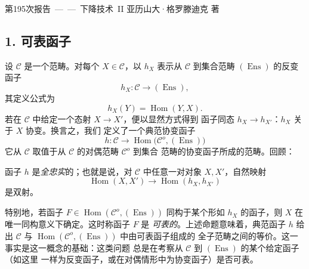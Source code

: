 \unit{第195次报告——下降技术 II}
%
  {亚历山大·格罗滕迪克 著}


\subsection*{1. 可表函子}

设 $\mathcal C$ 是一个范畴。对每个 $X\in\mathcal C$，以 $h_X$ 表示从
$\mathcal C$ 到集合范畴 $(\operatorname{Ens})$ 的反变函子
\[
  h_X:\mathcal C\longrightarrow(\operatorname{Ens}),
\]
其定义公式为
\[
  h_X(Y)=\operatorname{Hom}(Y,X).
\]
若在 $\mathcal C$ 中给定一个态射 $X\longrightarrow X'$，便以显然方式得到
函子同态 $h_X\longrightarrow h_{X'}$：$h_X$ 关于 $X$ 协变。换言之，我们
定义了一个典范协变函子
\[
  h:\mathcal C\longrightarrow
  \operatorname{Hom}\bigl(\mathcal C^o,(\operatorname{Ens})\bigr)
\]
它从 $\mathcal C$ 取值于从 $\mathcal C$ 的对偶范畴 $\mathcal C^o$ 到集合
范畴的协变函子所成的范畴。回顾：

 函子 $h$ 是\emph{全忠实}的；也就是说，对 $\mathcal C$
中任意一对对象 $X,X'$，自然映射
\[
  \operatorname{Hom}(X,X')\longrightarrow
  \operatorname{Hom}(h_X,h_{X'})
\]
是双射。

特别地，若函子
$F\in\operatorname{Hom}(\mathcal C^o,(\operatorname{Ens}))$ 同构于某个形如
$h_X$ 的函子，则 $X$ 在唯一同构意义下确定。这时称函子 $F$ 是
\emph{可表的}。上述命题意味着，典范函子 $h$ 给出 $\mathcal C$ 与
$\operatorname{Hom}(\mathcal C^o,(\operatorname{Ens}))$ 中由可表函子组成的
全子范畴之间的等价。这一事实是这一概念的基础：这类问题
总是在考察从 $\mathcal C$ 到 $(\operatorname{Ens})$ 的某个给定函子（如这里
一样为反变函子，或在对偶情形中为协变函子）是否可表。

